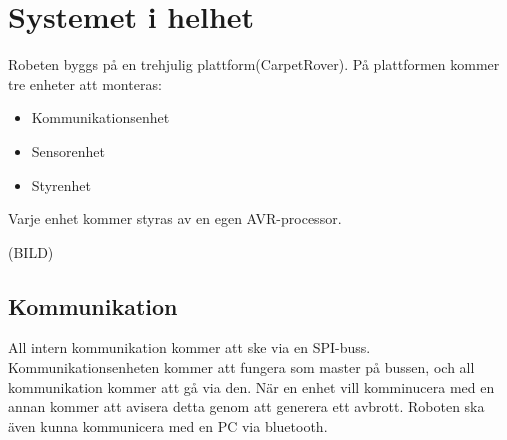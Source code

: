 \section{Systemet i helhet}
Robeten byggs på en trehjulig plattform(CarpetRover). På plattformen kommer tre enheter att monteras:
\begin{itemize}
        \item Kommunikationsenhet
        \item Sensorenhet
        \item Styrenhet
\end{itemize}
Varje enhet kommer styras av en egen AVR-processor.

(BILD)


\subsection{Kommunikation}
All intern kommunikation kommer att ske via en SPI-buss. Kommunikationsenheten kommer att fungera som master på bussen, och all kommunikation kommer att gå via den. När en enhet vill komminucera med en annan kommer att avisera detta genom att generera ett avbrott. 
Roboten ska även kunna kommunicera med en PC via bluetooth.


